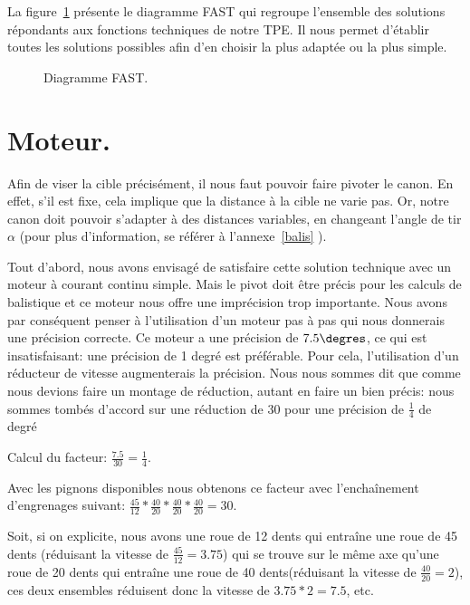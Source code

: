La figure~\ref{fast} présente le diagramme FAST qui regroupe l'ensemble des solutions répondants aux fonctions techniques de notre TPE. Il nous permet d'établir toutes les solutions possibles afin d'en choisir la plus adaptée ou la plus simple. 

\begin{figure}
	\begin{center}
		
	\end{center}
	\caption{Diagramme FAST.}
	\label{fast}
\end{figure}

\section{Moteur.}
Afin de viser la cible précisément, il nous faut pouvoir faire pivoter le canon. En effet, s'il est fixe, cela implique que la distance à la cible ne varie pas. Or, notre canon doit pouvoir s'adapter à des distances variables, en changeant l'angle de tir $\alpha$ (pour plus d'information, se référer à l'annexe~\ref{balis}  ). 

Tout d'abord, nous avons envisagé de satisfaire cette solution technique avec un moteur à courant continu simple. Mais le pivot doit être précis pour les calculs de balistique et ce moteur nous offre une imprécision trop importante. Nous avons par conséquent penser à l'utilisation d'un moteur pas à pas qui nous donnerais une précision correcte. Ce moteur a une précision de $7.5\degres$, ce qui est insatisfaisant: une précision de 1 degré est préférable. Pour cela, l'utilisation d'un réducteur de vitesse augmenterais la précision. Nous nous sommes dit que comme nous devions faire un montage de réduction, autant en faire un bien précis: nous sommes tombés d'accord sur une réduction de 30 pour une précision de $\frac{1}{4}$ de degré

Calcul du facteur: $\frac{7.5}{30} = \frac{1}{4}$.

Avec les pignons disponibles nous obtenons ce facteur avec l'enchaînement d'engrenages suivant:  $\frac{45}{12} * \frac{40}{20} * \frac{40}{20} * \frac{40}{20} = 30$.

Soit, si on explicite, nous avons une roue de 12 dents qui entraîne une roue de 45 dents (réduisant la vitesse de $\frac{45}{12} = 3.75$) qui se trouve sur le même axe qu'une roue de 20 dents qui entraîne une roue de 40 dents(réduisant la vitesse de $\frac{40}{20} = 2$), ces deux ensembles réduisent donc la vitesse de $3.75 * 2 = 7.5$, etc.

